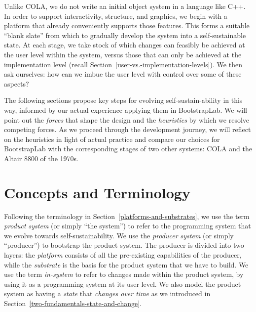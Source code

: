 \documentclass[ twoside,openright,titlepage,numbers=noenddot,headinclude,footinclude,cleardoublepage=empty,abstract=on,
                BCOR=5mm,paper=a4,fontsize=11pt
                ]{scrreprt}
\newcommand{\tomas}[1]{}
\theoremstyle{definition}
\begin{document}
Unlike \ac{COLA}, we do not write an initial object system in a language
like C++. In order to support interactivity, structure, and graphics, we
begin with a platform that already conveniently supports those features.
This forms a suitable ``blank slate'' from which to gradually develop
the system into a self-sustainable state. At each stage, we take stock
of which changes can feasibly be achieved at the user level within the
system, versus those that can only be achieved at the implementation
level (recall Section~\ref{user-vs.-implementation-levels}). We then ask
ourselves: how can we imbue the user level with control over some of
these aspects?

The following sections propose key steps for evolving
self-sustain-ability in this way, informed by our actual experience
applying them in BootstrapLab. We will point out the \emph{forces} that
shape the design and the \emph{heuristics} by which we resolve competing
forces. As we proceed through the development journey, we will reflect
on the heuristics in light of actual practice and compare our choices
for BootstrapLab with the corresponding stages of two other systems:
\ac{COLA} and the Altair 8800 of the 1970s.

\hypertarget{concepts-and-terminology}{\section{Concepts and Terminology}\label{concepts-and-terminology}}

\tomas{It would be nice to include the diagram I sketched here (if we think it can be useful for explaining things...)}

Following the terminology in Section~\ref{platforms-and-substrates}, we
use the term \emph{product system} (or simply ``the system'') to refer
to the programming system that we evolve towards self-sustainability. We
use the \emph{producer system} (or simply ``producer'') to bootstrap the
product system. The producer is divided into two layers: the
\emph{platform} consists of all the pre-existing capabilities of the
producer, while the \emph{substrate} is the basis for the product system
that we have to build. We use the term \emph{in-system} to refer to
changes made within the product system, by using it as a programming
system at its user level. We also model the product system as having a
\emph{state} that \emph{changes over time} as we introduced in
Section~\ref{two-fundamentals-state-and-change}.
\end{document}

